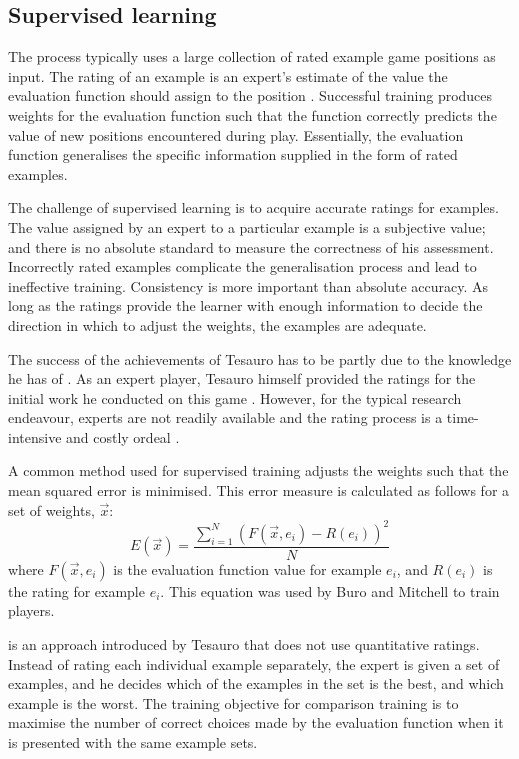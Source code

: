 \subsection{Supervised learning}   
The  process typically uses a large collection of rated example game positions as input. The rating of an example is an expert's estimate of the value the evaluation function should assign to the position \cite{furnkranz:survey}. Successful training produces weights for the evaluation function such that the function correctly predicts the value of new  positions encountered during play. Essentially, the evaluation function generalises the specific information supplied in the form of rated examples.  

The challenge of supervised learning is to acquire accurate ratings for examples. The value assigned by an expert to a particular example is a subjective value; and there is no absolute standard to measure the correctness of his assessment.  Incorrectly rated examples complicate the generalisation process and lead to ineffective training. Consistency is more important than absolute accuracy. As long as the ratings provide the learner with enough information to decide the direction in which to adjust the weights, the examples are adequate. 

The success of the achievements of Tesauro has to be partly due  to the knowledge he has of . As an expert player, Tesauro himself provided the ratings for the initial work he conducted on this game \cite{furnkranz:survey,tesauro:network}. However, for the typical research endeavour, experts are not readily available and the rating process is a time-intensive and costly ordeal \cite{furnkranz:survey}.

A common method used for supervised training adjusts the weights such that the mean squared error is minimised.  This error measure is calculated as follows for a set of weights, $\vec{x}$:
\[
E(\vec{x}) = \frac{\sum_{i=1}^{N} (F(\vec{x},e_i) - R(e_i))^2}{N}
\]
where $F(\vec{x},e_i)$ is the evaluation function value for example $e_i$, and $R(e_i)$ is the rating for example $e_i$.  
This equation was used by Buro \cite{buro:statistical, buro:feature} and Mitchell \cite{mitchell:masters} to train  players.  

 is an approach introduced by Tesauro \cite{tesauro:comparison} that does not use quantitative ratings.    Instead of rating each individual example separately, the expert is given a set of examples, and he decides which of the examples in the set is the best, and which example is the worst.  The training objective for comparison training is to maximise the number of correct choices made by the evaluation function when it is presented with the same example sets.

